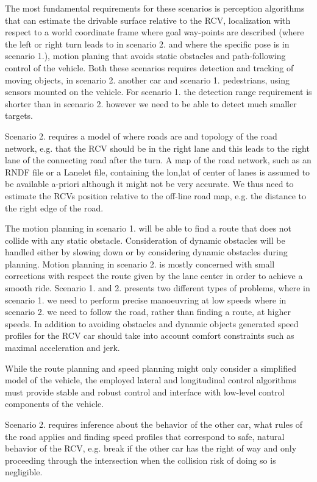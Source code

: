 \documentclass[11pt,a4paper]{article}
\begin{document}
The most fundamental requirements for these scenarios is perception
algorithms that can estimate the drivable surface relative to the RCV,
localization with respect to a world coordinate frame where goal
way-points are described (where the left or right turn leads to in
scenario 2. and where the specific pose is in scenario 1.), motion
planing that avoids static obstacles and path-following control of the
vehicle. Both these scenarios requires detection and tracking of moving
objects, in scenario 2. another car and scenario 1. pedestrians, using
sensors mounted on the vehicle. For scenario 1. the detection range
requirement is shorter than in scenario 2.  however we need to be able
to detect much smaller targets.

Scenario 2. requires a model of where roads are and topology of the
road network, e.g. that the RCV should be in the right lane and this
leads to the right lane of the connecting road after the turn. A map
of the road network, such as an RNDF file or a Lanelet file, containing
the lon,lat of center of lanes is assumed to be available a-priori
although it might not be very accurate. We thus need to estimate the
RCVs position relative to the off-line road map, e.g. the distance to
the right edge of the road.

The motion planning in scenario 1. will be able to find a
route that does not collide with any static obstacle.  Consideration
of dynamic obstacles will be handled either by slowing down or by
considering dynamic obstacles during planning. Motion planning in
scenario 2.  is mostly concerned with small corrections with respect
the route given by the lane center in order to achieve a smooth
ride. Scenario 1. and 2. presents two different types of problems,
where in scenario 1. we need to perform precise manoeuvring at low
speeds where in scenario 2. we need to follow the road, rather than
finding a route, at higher speeds. In addition to avoiding obstacles
and dynamic objects generated speed profiles for the RCV car should
take into account comfort constraints such as maximal acceleration and
jerk.

While the route planning and speed planning might only consider a
simplified model of the vehicle, the employed lateral and longitudinal
control algorithms must provide stable and robust control and interface
with low-level control components of the vehicle.

Scenario 2. requires inference about the behavior of the other car,
what rules of the road applies and finding speed profiles that
correspond to safe, natural behavior of the RCV, e.g. break if the
other car has the right of way and only proceeding through the
intersection when the collision risk of doing so is negligible.
\end{document}
